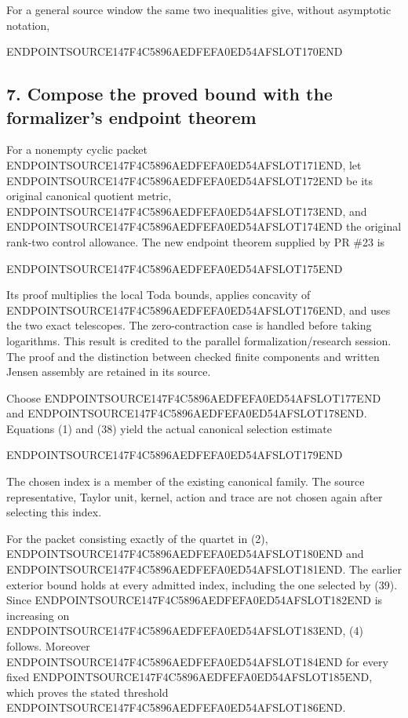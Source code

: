 For a general source window the same two inequalities give, without asymptotic notation,

ENDPOINTSOURCE147F4C5896AEDFEFA0ED54AFSLOT170END

\subsection{7. Compose the proved bound with the formalizer's endpoint theorem}\label{endpoint-arithmetic_original--compose-the-proved-bound-with-the-formalizers-endpoint-theorem}

For a nonempty cyclic packet ENDPOINTSOURCE147F4C5896AEDFEFA0ED54AFSLOT171END, let ENDPOINTSOURCE147F4C5896AEDFEFA0ED54AFSLOT172END be its original canonical quotient metric, ENDPOINTSOURCE147F4C5896AEDFEFA0ED54AFSLOT173END, and ENDPOINTSOURCE147F4C5896AEDFEFA0ED54AFSLOT174END the original rank-two control allowance. The new endpoint theorem supplied by PR \#23 is

ENDPOINTSOURCE147F4C5896AEDFEFA0ED54AFSLOT175END

Its proof multiplies the local Toda bounds, applies concavity of ENDPOINTSOURCE147F4C5896AEDFEFA0ED54AFSLOT176END, and uses the two exact telescopes. The zero-contraction case is handled before taking logarithms. This result is credited to the parallel formalization/research session. The proof and the distinction between checked finite components and written Jensen assembly are retained in its source.

Choose ENDPOINTSOURCE147F4C5896AEDFEFA0ED54AFSLOT177END and ENDPOINTSOURCE147F4C5896AEDFEFA0ED54AFSLOT178END. Equations (1) and (38) yield the actual canonical selection estimate

ENDPOINTSOURCE147F4C5896AEDFEFA0ED54AFSLOT179END

The chosen index is a member of the existing canonical family. The source representative, Taylor unit, kernel, action and trace are not chosen again after selecting this index.

For the packet consisting exactly of the quartet in (2), ENDPOINTSOURCE147F4C5896AEDFEFA0ED54AFSLOT180END and ENDPOINTSOURCE147F4C5896AEDFEFA0ED54AFSLOT181END. The earlier exterior bound holds at every admitted index, including the one selected by (39). Since ENDPOINTSOURCE147F4C5896AEDFEFA0ED54AFSLOT182END is increasing on ENDPOINTSOURCE147F4C5896AEDFEFA0ED54AFSLOT183END, (4) follows. Moreover ENDPOINTSOURCE147F4C5896AEDFEFA0ED54AFSLOT184END for every fixed ENDPOINTSOURCE147F4C5896AEDFEFA0ED54AFSLOT185END, which proves the stated threshold ENDPOINTSOURCE147F4C5896AEDFEFA0ED54AFSLOT186END.

